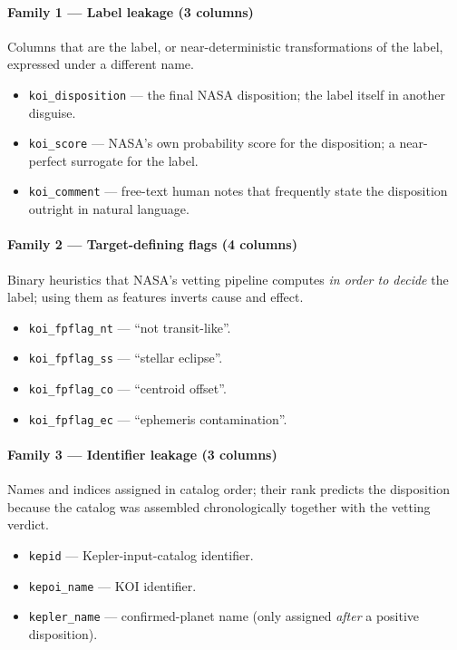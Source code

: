 \documentclass[conference]{IEEEtran}
\begin{document}
\paragraph*{Family 1 --- Label leakage (3 columns)}
Columns that are the label, or near-deterministic transformations of
the label, expressed under a different name.
\begin{itemize}
  \item \texttt{koi\_disposition} --- the final NASA disposition;
        the label itself in another disguise.
  \item \texttt{koi\_score} --- NASA's own probability score for
        the disposition; a near-perfect surrogate for the label.
  \item \texttt{koi\_comment} --- free-text human notes that
        frequently state the disposition outright in natural
        language.
\end{itemize}

\paragraph*{Family 2 --- Target-defining flags (4 columns)}
Binary heuristics that NASA's vetting pipeline computes \emph{in
order to decide} the label; using them as features inverts cause
and effect.
\begin{itemize}
  \item \texttt{koi\_fpflag\_nt} --- ``not transit-like''.
  \item \texttt{koi\_fpflag\_ss} --- ``stellar eclipse''.
  \item \texttt{koi\_fpflag\_co} --- ``centroid offset''.
  \item \texttt{koi\_fpflag\_ec} --- ``ephemeris contamination''.
\end{itemize}

\paragraph*{Family 3 --- Identifier leakage (3 columns)}
Names and indices assigned in catalog order; their rank predicts
the disposition because the catalog was assembled chronologically
together with the vetting verdict.
\begin{itemize}
  \item \texttt{kepid} --- Kepler-input-catalog identifier.
  \item \texttt{kepoi\_name} --- KOI identifier.
  \item \texttt{kepler\_name} --- confirmed-planet name (only
        assigned \emph{after} a positive disposition).
\end{itemize}
\end{document}
